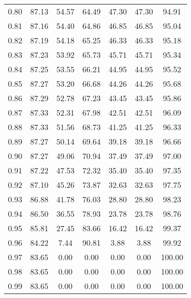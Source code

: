 \begin{tabular}{|c|c|c|c|c|c|c|}
      0.80 &     87.13 &     54.57 &      64.49 &   47.30 &      47.30 &         94.91 \\
      0.81 &     87.16 &     54.40 &      64.86 &   46.85 &      46.85 &         95.04 \\
      0.82 &     87.19 &     54.18 &      65.25 &   46.33 &      46.33 &         95.18 \\
      0.83 &     87.23 &     53.92 &      65.73 &   45.71 &      45.71 &         95.34 \\
      0.84 &     87.25 &     53.55 &      66.21 &   44.95 &      44.95 &         95.52 \\
      0.85 &     87.27 &     53.20 &      66.68 &   44.26 &      44.26 &         95.68 \\
      0.86 &     87.29 &     52.78 &      67.23 &   43.45 &      43.45 &         95.86 \\
      0.87 &     87.33 &     52.31 &      67.98 &   42.51 &      42.51 &         96.09 \\
      0.88 &     87.33 &     51.56 &      68.73 &   41.25 &      41.25 &         96.33 \\
      0.89 &     87.27 &     50.14 &      69.64 &   39.18 &      39.18 &         96.66 \\
      0.90 &     87.27 &     49.06 &      70.94 &   37.49 &      37.49 &         97.00 \\
      0.91 &     87.22 &     47.53 &      72.32 &   35.40 &      35.40 &         97.35 \\
      0.92 &     87.10 &     45.26 &      73.87 &   32.63 &      32.63 &         97.75 \\
      0.93 &     86.88 &     41.78 &      76.03 &   28.80 &      28.80 &         98.23 \\
      0.94 &     86.50 &     36.55 &      78.93 &   23.78 &      23.78 &         98.76 \\
      0.95 &     85.81 &     27.45 &      83.66 &   16.42 &      16.42 &         99.37 \\
      0.96 &     84.22 &      7.44 &      90.81 &    3.88 &       3.88 &         99.92 \\
      0.97 &     83.65 &      0.00 &       0.00 &    0.00 &       0.00 &        100.00 \\
      0.98 &     83.65 &      0.00 &       0.00 &    0.00 &       0.00 &        100.00 \\
      0.99 &     83.65 &      0.00 &       0.00 &    0.00 &       0.00 &        100.00 \\
\bottomrule
\end{tabular}
